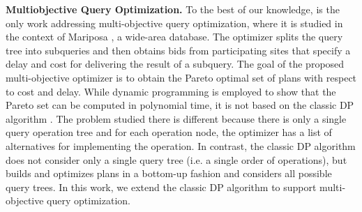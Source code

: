 \textbf{Multiobjective Query Optimization.} To the best of our
knowledge, \cite{papadimitriou_multiobjective_2001} is the only work
addressing multi-objective query optimization, where it is studied in
the context of Mariposa \cite{stonebraker_mariposa:_1996}, a wide-area
database. The optimizer splits the query tree into subqueries
and then obtains bids from participating sites that specify a delay
and cost for delivering the result of a subquery. The goal of the
proposed multi-objective optimizer
\cite{papadimitriou_multiobjective_2001} is to obtain the Pareto
optimal set of plans with respect to cost and delay. While dynamic
programming is employed to show that the Pareto set can be computed in
polynomial time, it is not based on the classic DP algorithm
\cite{selinger_access_1979}. The problem studied there is different
because there is only a single query operation tree and for each
operation node, the optimizer has a list of alternatives for
implementing the operation. In contrast, the classic DP algorithm does
not consider only a single query tree (i.e. a single order of
operations), but builds and optimizes plans in a bottom-up fashion and
considers all possible query trees. In this work, we extend the
classic DP algorithm to support multi-objective query optimization.












